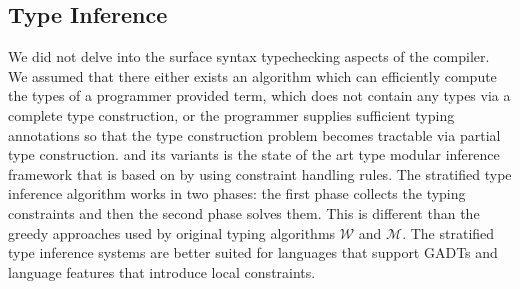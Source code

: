 \documentclass[screen,nonacm]{acmart}
\begin{document}
\subsection{Type Inference}\label{sec:rw-type-inf}
We did not delve into the surface syntax typechecking aspects of the
compiler. We assumed that there either exists an algorithm which can
efficiently compute the types of a programmer provided term, which
does not contain any types via a complete type
construction\cite{milner_theory_1978}, or the  programmer supplies
sufficient typing annotations so that the type construction problem
becomes tractable via partial type
construction\cite{pierce_local_2000, dunfield_bidirectional_2021}.
\HMX and its variants is the state of the art type modular inference
framework that is based on by using constraint handling rules. The
stratified type inference algorithm\cite{pottier_stratified_2006} works in two
phases: the first phase collects the typing constraints and then the
second phase solves them. This is different than the greedy approaches
used by original typing algorithms\cite{lee_proofs_1998} $\mathcal{W}$
and $\mathcal{M}$. The stratified type inference systems are better
suited for languages that support GADTs and language features that
introduce local constraints\cite{vytiniotis_outsideinx_2011}.
\end{document}
